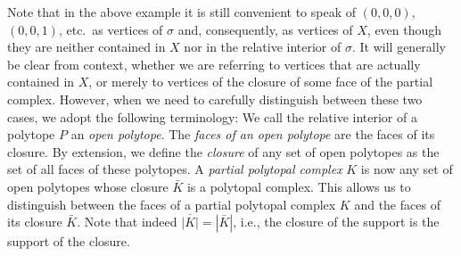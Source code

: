 \documentclass[12pt,reqno]{amsart}
\numberwithin{definition}{section}
\theoremstyle{definition}
\newcommand{\ehr}{\operatorname{ehr}}
\begin{document}
Note that in the above example it is still convenient to speak of $(0,0,0)$, $(0,0,1)$, etc.\ as vertices of $\sigma$ and, consequently, as vertices of $X$, even though they are neither contained in $X$ nor in the relative interior of $\sigma$. It will generally be clear from context, whether we are referring to vertices that are actually contained in $X$, or merely to vertices of the closure of some face of the partial complex. However, when we need to carefully distinguish between these two cases, we adopt the following terminology: We call the relative interior of a polytope $P$ an \emph{open polytope}. The \emph{faces of an open polytope} are the faces of its closure. By extension, we define the \emph{closure} of any set of open polytopes as the set of all faces of these polytopes. A \emph{partial polytopal complex} $K$ is now any set of open polytopes whose closure $\bar{K}$ is a polytopal complex. This allows us to distinguish between the faces of a partial polytopal complex $K$ and the faces of its closure $\bar{K}$. Note that indeed $\overline{|K|}=|\bar{K}|$, i.e., the closure of the support is the support of the closure.


\end{document}
